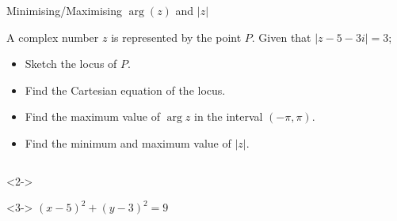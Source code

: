 \documentclass[8pt]{beamer}
\begin{document}
\begin{frame}[shrink=5]{Minimising/Maximising $\arg(z)$ and  $|z|$}
	\begin{problem}
		A complex number $z$ is represented by the point  $P$. Given that  $|z-5-3i|=3$;
		 \begin{itemize}
			\item Sketch the locus of $P$.
			\item Find the Cartesian equation of the locus.
			\item Find the maximum value of  $\arg z$ in the interval  $(-\pi,\pi)$.
			\item Find the minimum and maximum value of $|z|$.
		\end{itemize}
	\end{problem}

	\begin{columns}[T]
	\begin{column}{.4\linewidth}
		\begin{solution}<2->
				\begin{center}
\end{center}
\end{solution}
\begin{solution}<3->
	$(x-5)^2+(y-3)^2=9$
\end{solution}


\end{column}
\end{columns}
\end{frame}
\end{document}
